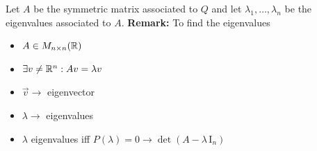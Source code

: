 Let $A$ be the symmetric matrix associated to $Q$ and let $\lambda_1,\ldots,\lambda_n$ be the eigenvalues associated to $A$.
\textbf{Remark: }To find the eigenvalues
\begin{itemize}
    \item $A\in M_{n\times n}(\mathbb{R})$
    \item $\exists v\neq\mathbb{R}^n : Av = \lambda v$
    \item $\vec{v} \to$ eigenvector
    \item $\lambda\to$ eigenvalues
    \item $\lambda$ eigenvalues iff $P(\lambda)=0 \to \det(A-\lambda\,\text{I}_n)$
\end{itemize}

